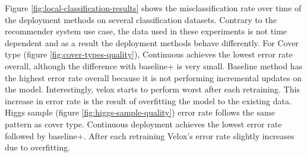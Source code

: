\documentclass{vldb}
\begin{document}
Figure \ref{fig:local-classification-results} shows the misclassification rate over time of the deployment methods on several classification datasets.
Contrary to the recommender system use case, the data used in these experiments is not time dependent and as a result the deployment methods behave differently.
For Cover type (figure \ref{fig:cover-types-quality}), Continuous achieves the lowest error rate overall, although the difference with baseline+ is very small.
Baseline method has the highest error rate overall because it is not performing incremental updates on the model.
Interestingly, velox starts to perform worst after each retraining.
This increase in error rate is the result of overfitting the model to the existing data. 
Higgs sample (figure \ref{fig:higgs-sample-quality}) error rate follows the same pattern as cover type.
Continuous deployment achieves the lowest error rate followed by baseline+.
After each retraining Velox's error rate slightly increases due to overfitting.
\end{document}
